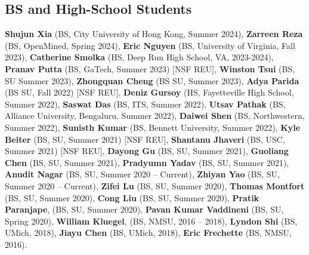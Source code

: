 \subsection*{BS and High-School Students}
  \textbf{Shujun Xia} (BS, City University of Hong Kong, Summer 2024), 
  \textbf{Zarreen Reza} (BS, OpenMined, Spring 2024), 
  \textbf{Eric Nguyen} (BS, University of Virginia, Fall 2023),
  \textbf{Catherine Smolka} (HS, Deep Run High School, VA, 2023-2024), 
  \textbf{Pranav Putta} (BS, GaTech, Summer 2023) [NSF REU],
  \textbf{Winston Tsui} (BS, SU Summer 2023),
  \textbf{Zhongquan Cheng} (BS SU, Summer 2023), 
  \textbf{Adya Parida} (BS SU, Fall 2022) [NSF REU], 
  \textbf{Deniz Gursoy} (HS, Fayetteville High School, Summer 2022), 
  \textbf{Saswat Das} (BS, ITS, Summer 2022), 
  \textbf{Utsav Pathak} (BS, Alliance University, Bengaluru, Summer 2022),
  \textbf{Daiwei Shen} (BS, Northwestern, Summer 2022),
  \textbf{Sunisth Kumar} (BS, Bennett University, Summer 2022),
  \textbf{Kyle Beiter} (BS, SU, Summer 2021) [NSF REU],  %
  \textbf{Shantanu Jhaveri} (BS, USC, Summer 2021) [NSF REU], %
  \textbf{Dayong Gu} (BS, SU, Summer 2021),
  \textbf{Guoliang Chen} (BS, SU, Summer 2021),
  \textbf{Pradyumn Yadav} (BS, SU, Summer 2021),
  \textbf{Anudit Nagar} (BS, SU, Summer 2020 -- Current), 
  \textbf{Zhiyan Yao} (BS, SU, Summer 2020 -- Current),
  \textbf{Zifei Lu} (BS, SU, Summer 2020),
  \textbf{Thomas Montfort} (BS, SU, Summer 2020),
  \textbf{Cong Liu} (BS, SU, Summer 2020),
  \textbf{Pratik Paranjape}, (BS, SU, Summer 2020),
  \textbf{Pavan Kumar Vaddineni} (BS, SU, Spring 2020),
  \textbf{William Kluegel}, (BS, NMSU, 2016 -- 2018), 
  \textbf{Lyndon Shi} (BS, UMich, 2018), 
  \textbf{Jiayu Chen} (BS, UMich, 2018), 
  \textbf{Eric Frechette} (BS, NMSU, 2016).
\medskip

